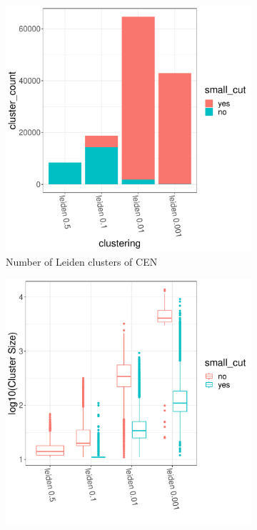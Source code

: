 \documentclass[11pt]{article}   	%
\begin{document}
\begin{figure}[H]
\centering
\begin{subfigure}[t]{0.45\textwidth}
\begin{center}
\includegraphics[width=0.9\linewidth]{figs/cen_istouched.pdf}
\caption{Number of Leiden clusters of CEN}
\end{center}
\label{fig:cenistouched-part1}
\end{subfigure}
\begin{subfigure}[t]{0.45\textwidth}
\begin{center}
\includegraphics[width=0.9\linewidth]{figs/cen_boxplot.pdf}

\end{center}
\end{subfigure}
\end{figure}
\end{document}
